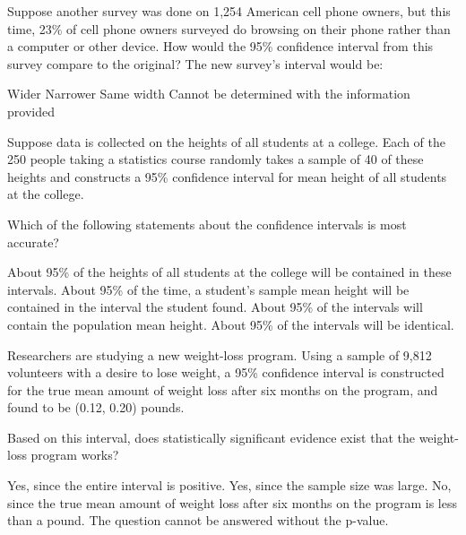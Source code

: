 \documentclass{article}
\begin{document}
\begin{mcquestions}
		Suppose another survey was done on 1,254 American cell phone owners, but this time, 23\% of cell phone owners surveyed do browsing on their phone rather than a computer or other device.  How would the 95\% confidence interval from this survey compare to the original? The new survey's interval would be:
		\begin{mcanswerslist}
			\answer[correct]  Wider
			\answer Narrower
			\answer Same width
			\answer Cannot be determined with the information provided
		\end{mcanswerslist}
		
		\question Suppose data is collected on the heights of all students at a college.  Each of the 250 people taking a statistics course randomly takes a sample of 40 of these heights and constructs a 95\% confidence interval for mean height of all students at the college.
		
		Which of the following statements about the confidence intervals is most accurate?
		\begin{mcanswerslist}
			\answer About 95\% of the heights of all students at the college will be contained in these intervals.
			\answer About 95\% of the time, a student's sample mean height will be contained in the interval the student found.
			\answer[correct] About 95\% of the intervals will contain the population mean height.
			\answer About 95\% of the intervals will be identical.
		\end{mcanswerslist}
		
		\question Researchers are studying a new weight-loss program. Using a sample of 9,812 volunteers with a desire to lose weight, a 95\% confidence interval is constructed for the true mean amount of weight loss after six months on the program, and found to be (0.12, 0.20) pounds.
		
		Based on this interval, does statistically significant evidence exist that the weight-loss program works?
		\begin{mcanswerslist}
			\answer[correct] Yes, since the entire interval is positive.
			\answer Yes, since the sample size was large.
			\answer No, since the true mean amount of weight loss after six months on the program is less than a pound.
			\answer The question cannot be answered without the p-value.
		\end{mcanswerslist}
	\end{mcquestions}
\end{document}
